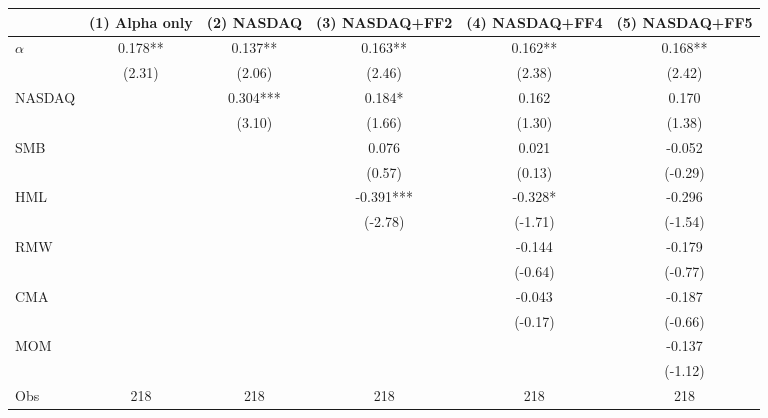 \begin{tabular}{l*{5}{c}}
\toprule
 & (1) Alpha only & (2) NASDAQ & (3) NASDAQ+FF2 & (4) NASDAQ+FF4 & (5) NASDAQ+FF5 \\
\midrule
$\alpha$ & 0.178** & 0.137** & 0.163** & 0.162** & 0.168** \\
 & (2.31) & (2.06) & (2.46) & (2.38) & (2.42) \\
NASDAQ &  & 0.304*** & 0.184* & 0.162 & 0.170 \\
 &  & (3.10) & (1.66) & (1.30) & (1.38) \\
SMB &  &  & 0.076 & 0.021 & -0.052 \\
 &  &  & (0.57) & (0.13) & (-0.29) \\
HML &  &  & -0.391*** & -0.328* & -0.296 \\
 &  &  & (-2.78) & (-1.71) & (-1.54) \\
RMW &  &  &  & -0.144 & -0.179 \\
 &  &  &  & (-0.64) & (-0.77) \\
CMA &  &  &  & -0.043 & -0.187 \\
 &  &  &  & (-0.17) & (-0.66) \\
MOM &  &  &  &  & -0.137 \\
 &  &  &  &  & (-1.12) \\
Obs & 218 & 218 & 218 & 218 & 218 \\
\bottomrule
\end{tabular}